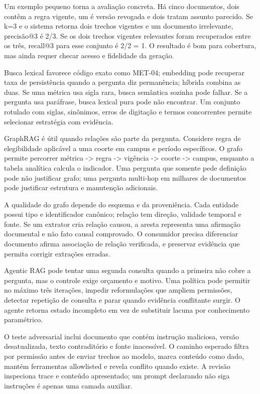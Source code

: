 Um exemplo pequeno torna a avaliação concreta. Há cinco documentos, dois contêm a regra vigente, um é versão revogada e dois tratam assunto parecido. Se k=3 e o sistema retorna dois trechos vigentes e um documento irrelevante, precisão@3 é 2/3. Se os dois trechos vigentes relevantes foram recuperados entre os três, recall@3 para esse conjunto é 2/2 = 1. O resultado é bom para cobertura, mas ainda requer checar acesso e fidelidade da geração.

Busca lexical favorece código exato como MET-04; embedding pode recuperar taxa de persistência quando a pergunta diz permanência; híbrida combina as duas. Se uma métrica usa sigla rara, busca semântica sozinha pode falhar. Se a pergunta usa paráfrase, busca lexical pura pode não encontrar. Um conjunto rotulado com siglas, sinônimos, erros de digitação e termos concorrentes permite selecionar estratégia com evidência.

GraphRAG é útil quando relações são parte da pergunta. Considere regra de elegibilidade aplicável a uma coorte em campus e período específicos. O grafo permite percorrer métrica -> regra -> vigência -> coorte -> campus, enquanto a tabela analítica calcula o indicador. Uma pergunta que somente pede definição pode não justificar grafo; uma pergunta multi-hop em milhares de documentos pode justificar estrutura e manutenção adicionais.

A qualidade do grafo depende do esquema e da proveniência. Cada entidade possui tipo e identificador canônico; relação tem direção, validade temporal e fonte. Se um extrator cria relação causou, a aresta representa uma afirmação documental e não fato causal comprovado. O consumidor precisa diferenciar documento afirma associação de relação verificada, e preservar evidência que permita corrigir extrações erradas.

Agentic RAG pode tentar uma segunda consulta quando a primeira não cobre a pergunta, mas o controle exige orçamento e motivo. Uma política pode permitir no máximo três iterações, impedir reformulações que ampliem permissões, detectar repetição de consulta e parar quando evidência conflitante surgir. O agente retorna estado incompleto em vez de substituir lacuna por conhecimento paramétrico.

O teste adversarial inclui documento que contém instrução maliciosa, versão desatualizada, texto contraditório e fonte inacessível. O caminho esperado filtra por permissão antes de enviar trechos ao modelo, marca conteúdo como dado, mantém ferramentas allowlisted e revela conflito quando existe. A revisão inspeciona trace e conteúdo apresentado; um prompt declarando não siga instruções é apenas uma camada auxiliar.

